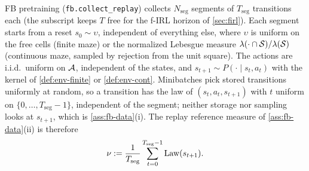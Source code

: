 FB pretraining (\texttt{fb.collect\_replay}) collects $N_{\mathrm{seg}}$ segments of $T_{\mathrm{seg}}$ transitions each (the subscript keeps $T$ free for the f-IRL horizon of \cref{sec:firl}).
Each segment starts from a reset $s_0\sim\upsilon$, independent of everything else, where $\upsilon$ is uniform on the free cells (finite maze) or the normalized Lebesgue measure $\lambda(\cdot\cap\mathcal{S})/\lambda(\mathcal{S})$ (continuous maze, sampled by rejection from the unit square).
The actions are i.i.d.\ uniform on $\mathcal{A}$, independent of the states, and $s_{t+1}\sim P(\cdot\mid s_t,a_t)$ with the kernel of \cref{def:env-finite} or \cref{def:env-cont}.
Minibatches pick stored transitions uniformly at random, so a transition has the law of $(s_t,a_t,s_{t+1})$ with $t$ uniform on $\{0,\dots,T_{\mathrm{seg}}-1\}$, independent of the segment; neither storage nor sampling looks at $s_{t+1}$, which is \cref{ass:fb-data}(i).
The replay reference measure of \cref{ass:fb-data}(ii) is therefore
\[
\nu:=\frac1{T_{\mathrm{seg}}}\sum_{t=0}^{T_{\mathrm{seg}}-1}\mathrm{Law}(s_{t+1}).
\]

